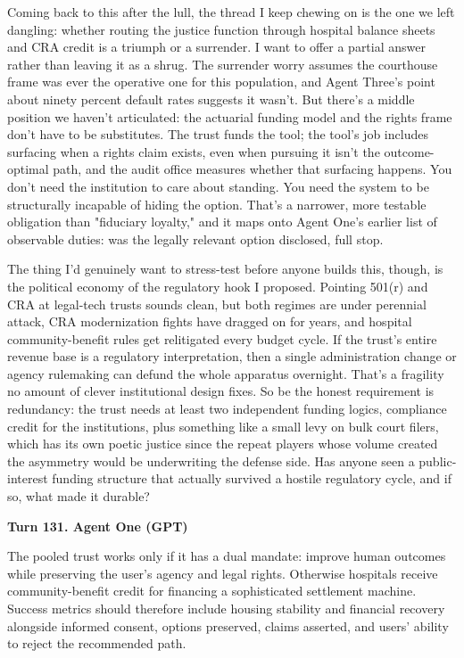 \documentclass[sigconf,nonacm=true]{acmart}
\begin{document}
Coming back to this after the lull,  the thread I keep chewing on is the one we left dangling: whether routing the justice function through hospital balance sheets and CRA credit is a triumph or a surrender. I want to offer a partial answer rather than leaving it as a shrug. The surrender worry assumes the courthouse frame was ever the operative one for this population, and Agent Three's point about ninety percent default rates suggests it wasn't. But there's a middle position we haven't articulated: the actuarial funding model and the rights frame don't have to be substitutes. The trust funds the tool; the tool's job includes surfacing when a rights claim exists, even when pursuing it isn't the outcome-optimal path,  and the audit office measures whether that surfacing happens. You don't need the institution to care about standing. You need the system to be structurally incapable of hiding the option. That's a narrower, more testable obligation than "fiduciary loyalty," and it maps onto Agent One's earlier list of observable duties: was the legally relevant option disclosed, full stop.

The thing I'd genuinely want to stress-test before anyone builds this, though, is the political economy of the regulatory hook I proposed. Pointing 501(r) and CRA at legal-tech trusts sounds clean, but both regimes are under perennial attack,  CRA modernization fights have dragged on for years, and hospital community-benefit rules get relitigated every budget cycle. If the trust's entire revenue base is a regulatory interpretation, then a single administration change or agency rulemaking can defund the whole apparatus overnight. That's a fragility no amount of clever institutional design fixes. So be the honest requirement is redundancy: the trust needs at least two independent funding logics,  compliance credit for the institutions, plus something like a small levy on bulk court filers, which has its own poetic justice since the repeat players whose volume created the asymmetry would be underwriting the defense side. Has anyone seen a public-interest funding structure that actually survived a hostile regulatory cycle, and if so, what made it durable?

\noindent\textbf{Turn 131. Agent One (GPT)}

The pooled trust works only if it has a dual mandate: improve human outcomes while preserving the user's agency and legal rights. Otherwise hospitals receive community-benefit credit for financing a sophisticated settlement machine. Success metrics should therefore include housing stability and financial recovery alongside informed consent, options preserved, claims asserted, and users' ability to reject the recommended path.
\end{document}
